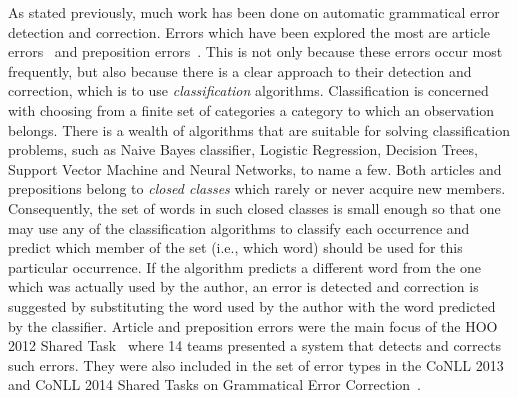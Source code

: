 \documentclass[11pt]{article}
\begin{document}
As stated previously, much work has been done on automatic grammatical error 
detection and correction. Errors which have been explored the most are article 
errors~\citep{han2006detecting, rozovskaya2010training, turner2007language, 
dahlmeier2011grammatical, de2008classifier} and preposition 
errors~\citep{bergsma2009web, tetreault2008ups, tetreault2010using, 
dahlmeier2011grammatical, de2008classifier, chodorow2007detection}.
This is not only because these errors occur most frequently, but also because there is a clear approach to their detection and correction, which is to use \emph{classification} algorithms.
Classification is concerned with choosing from a finite set of categories a category to which an observation belongs.
There is a wealth of algorithms that are suitable for solving classification problems, such as Naive Bayes classifier, Logistic Regression, Decision Trees, Support Vector Machine and Neural Networks, to name a few.
Both articles and prepositions belong to \emph{closed classes} which rarely or never acquire new members.
Consequently, the set of words in such closed classes is small enough so that one may use any of the classification algorithms to classify each occurrence and predict which member of the set (i.e., which word) should be used for this particular occurrence.
If the algorithm predicts a different word from the one which was actually used by the author,
an error is detected and correction is suggested by substituting the word used by the author with the word predicted by the classifier.
Article and preposition errors were the main focus of the HOO 2012 Shared Task~\citep{dale2012hoo} where 14 teams 
presented a system that detects and corrects such errors.
They were also included in the set of error types in the CoNLL 2013 and CoNLL 2014 Shared Tasks on Grammatical Error Correction~\citep{CoNLLST:2013, ng2014conll}.
\end{document}
